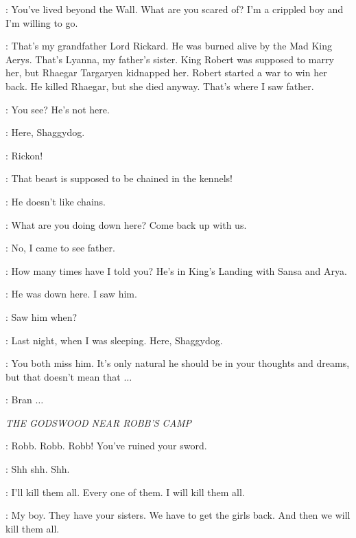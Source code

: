 \BRAN: You've lived beyond the Wall. What are you scared of? I'm a crippled boy and I'm willing to go. 


\BRAN: That's my grandfather Lord Rickard. He was burned alive by the Mad King Aerys. That's Lyanna, my father's sister. King Robert was supposed to marry her, but Rhaegar Targaryen kidnapped her. Robert started a war to win her back. He killed Rhaegar, but she died anyway. That's where I saw father. 

\OSHA: You see? He's not here. 


\RICKON: Here, Shaggydog. 

\BRAN: Rickon! 

\OSHA: That beast is supposed to be chained in the kennels! 

\RICKON: He doesn't like chains. 

\BRAN: What are you doing down here? Come back up with us. 

\RICKON: No, I came to see father. 

\BRAN: How many times have I told you? He's in King's Landing with Sansa and Arya. 

\RICKON: He was down here. I saw him. 

\BRAN: Saw him when? 

\RICKON: Last night, when I was sleeping. Here, Shaggydog. 

\OSHA: You both miss him. It's only natural he should be in your thoughts and dreams, but that doesn't mean that $\ldots$  


\LUWIN: Bran $\ldots$ 


\scene

\textit{THE GODSWOOD NEAR ROBB'S CAMP} 


\CATELYN: Robb. Robb. Robb! You've ruined your sword. 


\CATELYN: Shh shh. Shh. 

\ROBB: I'll kill them all. Every one of them. I will kill them all. 

\CATELYN: My boy. They have your sisters. We have to get the girls back. And then we will kill them all. 


\scene

